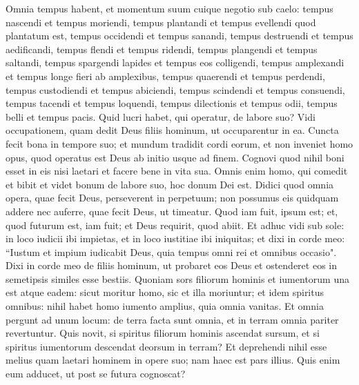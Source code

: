 \begin{biblechapter}  
\verse Omnia tempus habent, et momentum suum cuique negotio sub caelo: 
\verse tempus nascendi et tempus moriendi, tempus plantandi et tempus evellendi quod plantatum est, 
\verse tempus occidendi et tempus sanandi, tempus destruendi et tempus aedificandi, 
\verse tempus flendi et tempus ridendi, tempus plangendi et tempus saltandi, 
\verse tempus spargendi lapides et tempus eos colligendi, tempus amplexandi et tempus longe fieri ab amplexibus, 
\verse tempus quaerendi et tempus perdendi, tempus custodiendi et tempus abiciendi, 
\verse tempus scindendi et tempus consuendi, tempus tacendi et tempus loquendi, 
\verse tempus dilectionis et tempus odii, tempus belli et tempus pacis. 
\verse Quid lucri habet, qui operatur, de labore suo? 
\verse Vidi occupationem, quam dedit Deus filiis hominum, ut occuparentur in ea.  
\verse Cuncta fecit bona in tempore suo; et mundum tradidit cordi eorum, et non inveniet homo opus, quod operatus est Deus ab initio usque ad finem. 
\verse Cognovi quod nihil boni esset in eis nisi laetari et facere bene in vita sua.  
\verse Omnis enim homo, qui comedit et bibit et videt bonum de labore suo, hoc donum Dei est. 
\verse Didici quod omnia opera, quae fecit Deus, perseverent in perpetuum; non possumus eis quidquam addere nec auferre, quae fecit Deus, ut timeatur. 
\verse Quod iam fuit, ipsum est; et, quod futurum est, iam fuit; et Deus requirit, quod abiit. 
\verse Et adhuc vidi sub sole: in loco iudicii ibi impietas, et in loco iustitiae ibi iniquitas; 
\verse et dixi in corde meo: “Iustum et impium iudicabit Deus, quia tempus omni rei et omnibus occasio". 
\verse Dixi in corde meo de filiis hominum, ut probaret eos Deus et ostenderet eos in semetipsis similes esse bestiis. 
\verse Quoniam sors filiorum hominis et iumentorum una est atque eadem: sicut moritur homo, sic et illa moriuntur; et idem spiritus omnibus: nihil habet homo iumento amplius, quia omnia vanitas.  
\verse Et omnia pergunt ad unum locum: de terra facta sunt omnia, et in terram omnia pariter revertuntur. 
\verse Quis novit, si spiritus filiorum hominis ascendat sursum, et si spiritus iumentorum descendat deorsum in terram? 
\verse Et deprehendi nihil esse melius quam laetari hominem in opere suo; nam haec est pars illius. Quis enim eum adducet, ut post se futura cognoscat? 
\end{biblechapter}

